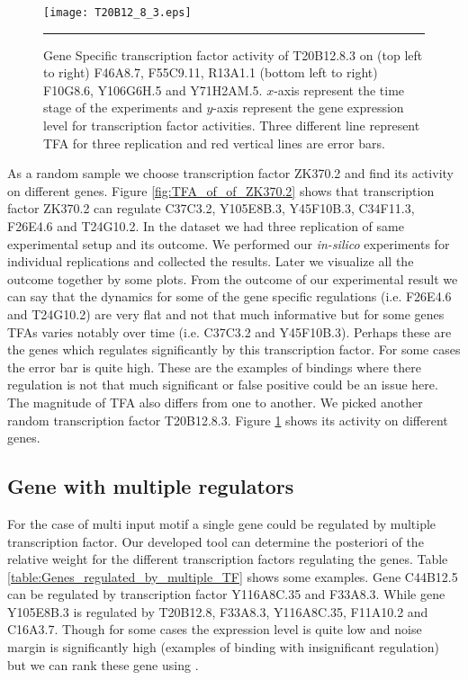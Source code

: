 \begin{figure}
	\centering
		\texttt{[image: T20B12\_8\_3.eps]}
		\rule{35em}{0.5pt}
	\caption[Gene Specific transcription factor activity of T20B12.8.3]
		{Gene Specific transcription factor activity of T20B12.8.3 on (top left to right) F46A8.7, F55C9.11, R13A1.1 (bottom left to right) F10G8.6, Y106G6H.5 and Y71H2AM.5. $x$-axis represent the time stage of the experiments and $y$-axis represent the gene expression level for transcription factor activities. Three different line represent TFA for three replication and red vertical lines are error bars.}
	\label{fig:TFA_of_of_T20B12_8_3}
\end{figure}

As a random sample we choose transcription factor ZK370.2 and find its activity on different genes. Figure \ref{fig:TFA_of_of_ZK370.2} shows that transcription factor ZK370.2 can regulate C37C3.2, Y105E8B.3, Y45F10B.3, C34F11.3, F26E4.6 and T24G10.2. In the dataset we had three replication of same experimental setup and its outcome. We performed our \textit{in-silico} experiments for individual replications and collected the results. Later we visualize all the outcome together by some plots. From the outcome of our experimental result we can say that the dynamics for some of the gene specific regulations (i.e. F26E4.6 and T24G10.2) are very flat and not that much informative but for some genes TFAs varies notably over time (i.e. C37C3.2 and Y45F10B.3). Perhaps these are the genes which regulates significantly by this transcription factor. For some cases the error bar is quite high. These are the examples of bindings where there regulation is not that much significant or false positive could be an issue here. The magnitude of TFA also differs from one to another. We picked another random transcription factor T20B12.8.3. Figure \ref{fig:TFA_of_of_T20B12_8_3} shows its activity on different genes.


\subsection{Gene with multiple regulators}
For the case of multi input motif a single gene could be regulated by multiple transcription factor. Our developed tool can determine the posteriori of the relative weight for the different transcription
factors regulating the genes. Table \ref{table:Genes_regulated_by_multiple_TF} shows some examples. Gene C44B12.5 can be regulated by transcription factor Y116A8C.35 and F33A8.3. While gene
Y105E8B.3 is regulated by T20B12.8, F33A8.3, Y116A8C.35, F11A10.2 and C16A3.7. Though for some cases the expression level is quite low and noise margin is significantly high (examples of binding with insignificant regulation) but we can rank these gene using \cite{Kalaitzis:2011}.

